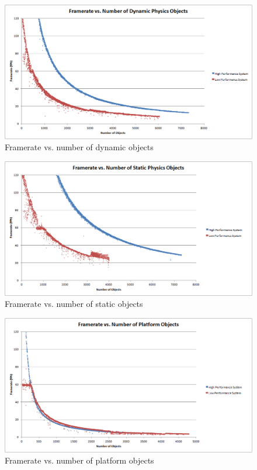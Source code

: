 \documentclass[12pt, titlepage]{article}
\begin{document}
\begin{figure}[H]
\centering
\includegraphics[width=\textwidth]{frameratedynamic}
\caption{Framerate vs. number of dynamic objects} \label{fig:frdynamic}
\end{figure}


\begin{figure}[H]
\centering
\includegraphics[width=\textwidth]{frameratestatic}
\caption{Framerate vs. number of static objects} \label{fig:frstat}
\end{figure}

\begin{figure}[H]
\centering
\includegraphics[width=\textwidth]{framerateplat}
\caption{Framerate vs. number of platform objects} \label{fig:frplat}
\end{figure}
\end{document}
